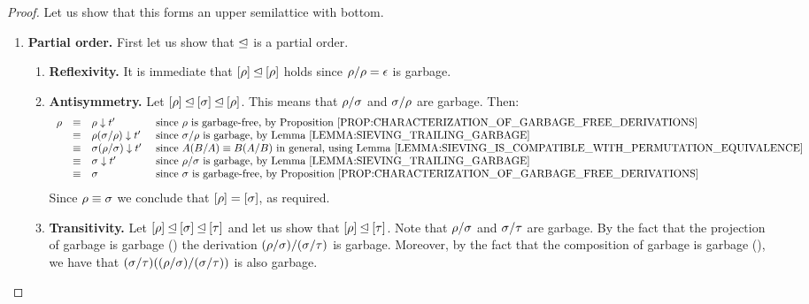 \begin{proof}
Let us show that this forms an upper semilattice with bottom.
\begin{enumerate}
\item {\bf Partial order.}
  First let us show that $\unlhd$ is a partial order.
  \begin{enumerate}
  \item {\bf Reflexivity.}
    It is immediate that ${[\rho]} \unlhd {[\rho]}$ holds since $\rho/\rho = \epsilon$ is garbage.
  \item {\bf Antisymmetry.}
    Let ${[\rho]} \unlhd {[\sigma]} \unlhd {[\rho]}$.
    This means that $\rho/\sigma$ and $\sigma/\rho$ are garbage.
    Then:
    \[
      \begin{array}{rcll}
      \redseq
      & \permeq & \redseq \sieve \tm' & \text{ since $\redseq$ is garbage-free, by \rprop{characterization_of_garbage_free_derivations}} \\
      & \permeq & \redseq(\redseqtwo/\redseq) \sieve \tm' & \text{ since $\redseqtwo/\redseq$ is garbage, by \rlem{sieving_trailing_garbage}} \\
      & \permeq & \redseqtwo(\redseq/\redseqtwo) \sieve \tm' & \text{ since $A(B/A) \permeq B(A/B)$ in general, using \rlem{sieving_is_compatible_with_permutation_equivalence}} \\
      & \permeq & \redseqtwo \sieve \tm' & \text{ since $\redseq/\redseqtwo$ is garbage, by \rlem{sieving_trailing_garbage}} \\
      & \permeq & \redseqtwo & \text{ since $\redseqtwo$ is garbage-free, by \rprop{characterization_of_garbage_free_derivations}} \\
      \end{array}
    \]
    Since $\rho \equiv \sigma$ we conclude that ${[\rho]} = {[\sigma]}$,
    as required.
  \item {\bf Transitivity.}
    Let ${[\rho]} \unlhd {[\sigma]} \unlhd {[\tau]}$
    and let us show that ${[\rho]} \unlhd {[\tau]}$.
    Note that $\rho/\sigma$ and $\sigma/\tau$ are garbage.
    By the fact that the projection of garbage is garbage ()
    the derivation $(\rho/\sigma)/(\sigma/\tau)$ is garbage.
      Moreover, by the fact that the composition of garbage is garbage (),
    we have that $(\sigma/\tau)((\rho/\sigma)/(\sigma/\tau))$ is also garbage.

\end{enumerate}
\end{enumerate}
\end{proof}

